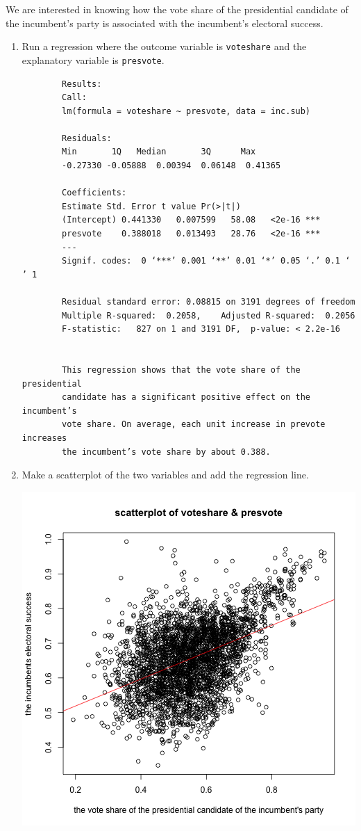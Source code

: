 \documentclass[12pt,letterpaper]{article}
\begin{document}
\noindent We are interested in knowing how the vote share of the presidential candidate of the incumbent's party is associated with the incumbent's electoral success.
	\vspace{.25cm}
	\begin{enumerate}
		\item Run a regression where the outcome variable is \texttt{voteshare} and the explanatory variable is \texttt{presvote}.
		
		 
		
		\begin{verbatim} 
		Results: 
		Call:
		lm(formula = voteshare ~ presvote, data = inc.sub)
		
		Residuals:
		Min       1Q   Median       3Q      Max 
		-0.27330 -0.05888  0.00394  0.06148  0.41365 
		
		Coefficients:
		Estimate Std. Error t value Pr(>|t|)    
		(Intercept) 0.441330   0.007599   58.08   <2e-16 ***
		presvote    0.388018   0.013493   28.76   <2e-16 ***
		---
		Signif. codes:  0 ‘***’ 0.001 ‘**’ 0.01 ‘*’ 0.05 ‘.’ 0.1 ‘ ’ 1
		
		Residual standard error: 0.08815 on 3191 degrees of freedom
		Multiple R-squared:  0.2058,	Adjusted R-squared:  0.2056 
		F-statistic:   827 on 1 and 3191 DF,  p-value: < 2.2e-16
		
		
		This regression shows that the vote share of the presidential 
		candidate has a significant positive effect on the incumbent’s 
		vote share. On average, each unit increase in prevote increases 
		the incumbent’s vote share by about 0.388.
		\end{verbatim}
		
		
		\item Make a scatterplot of the two variables and add the regression line. 
		
		  
		\includegraphics[width=.75\textwidth]{q3_regression.png}
		

\end{enumerate}
\end{document}
